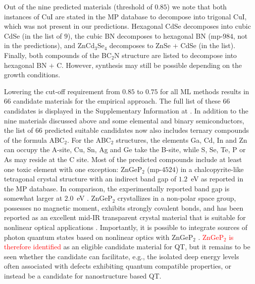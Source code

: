 \documentclass[superscriptaddress,unsortedaddress,
 amsmath,amssymb,
 aps,
]{revtex4-2}
\newcommand{\mrk}[1]{\textcolor{red}{#1}}
\begin{document}
Out of the nine predicted materials (threshold of $0.85$) we note that both instances of CuI are stated in the MP database to decompose into trigonal CuI, which was not present in our predictions. Hexagonal CdSe decomposes into cubic CdSe (in the list of $9$), the cubic BN decomposes to hexagonal BN (mp-$984$, not in the predictions), and ZnCd$_3$Se$_4$ decomposes to ZnSe $+$ CdSe (in the list). Finally, both compounds of the BC$_2$N structure are listed to decompose into hexagonal BN $+$ C. 
However, synthesis may still be possible depending on the growth conditions. 

Lowering the cut-off requirement from $0.85$ to $0.75$ for all ML methods results in $66$ candidate materials for the empirical approach.  
The full list of these $66$ candidates is displayed in the Supplementary Information at \cite{supplementary}. 
In addition to the nine materials discussed above and some elemental and binary semiconductors, the list of $66$ predicted suitable candidates now also includes ternary compounds of the formula ABC$_2$. For the ABC$_2$ structures, the elements Ga, Cd, In and Zn can occupy the A-site, Cu, Sn, Ag and Ge take the B-site, while S, Se, Te, P or As may reside at the C site. Most of the predicted compounds include at least one toxic element with one exception: ZnGeP$_2$ (mp-$4524$) in a chalcopyrite-like tetragonal crystal structure with an indirect band gap of $1.2$~eV \cite{Zhang2015} as reported in the MP database. In comparison, the experimentally reported band gap is somewhat larger at $2.0$~eV \cite{Xing1989}. 
ZnGeP$_2$ crystallizes in a non-polar space group, possesses no magnetic moment, exhibits strongly covalent bonds, and has been reported as an excellent mid-IR transparent crystal material that is suitable for nonlinear optical applications \cite{Zhang2015}. Importantly, it is possible to integrate sources of photon quantum states based on nonlinear optics with ZnGeP$_2$ \cite{Caspani2017}. 
\mrk{ZnGeP$_2$ is therefore identified} as an eligible candidate material for QT, but it remains to be seen whether the candidate can facilitate, e.g., the isolated deep energy levels often associated with defects exhibiting quantum compatible properties, or instead be a candidate for nanostructure based QT.  
\end{document}
